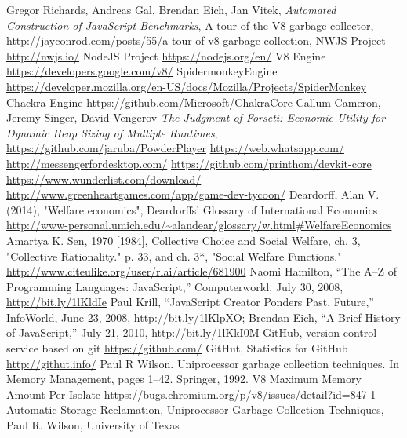 \documentclass{l4proj}
\begin{document}
\begin{thebibliography}{9}
Gregor Richards, Andreas Gal, Brendan Eich, Jan Vitek,
\emph{Automated Construction of JavaScript Benchmarks},
A tour of the V8 garbage collector,
\url{http://jayconrod.com/posts/55/a-tour-of-v8-garbage-collection},
NWJS Project
\url{http://nwjs.io/}
NodeJS Project
\url{https://nodejs.org/en/}
V8 Engine
\url{https://developers.google.com/v8/}
SpidermonkeyEngine
\url{https://developer.mozilla.org/en-US/docs/Mozilla/Projects/SpiderMonkey}
Chackra Engine
\url{https://github.com/Microsoft/ChakraCore}
Callum Cameron, Jeremy Singer, David Vengerov
\emph{The Judgment of Forseti: Economic Utility for Dynamic Heap Sizing of Multiple Runtimes},
\url{https://github.com/jaruba/PowderPlayer}
\url{https://web.whatsapp.com/}
\url{http://messengerfordesktop.com/}
\url{https://github.com/printhom/devkit-core}
\url{https://www.wunderlist.com/download/}
\url{http://www.greenheartgames.com/app/game-dev-tycoon/}
Deardorff, Alan V. (2014), "Welfare economics", Deardorffs' Glossary of International Economics \url{http://www-personal.umich.edu/~alandear/glossary/w.html#WelfareEconomics}
Amartya K. Sen, 1970 [1984], Collective Choice and Social Welfare, ch. 3, "Collective Rationality." p. 33, and ch. 3*, "Social Welfare Functions." \url{http://www.citeulike.org/user/rlai/article/681900}
Naomi Hamilton, “The A–Z of Programming Languages: JavaScript,” Computerworld, July 30, 2008, \url{http://bit.ly/1lKldIe}
 Paul Krill, “JavaScript Creator Ponders Past, Future,” InfoWorld, June 23, 2008, http://bit.ly/1lKlpXO; Brendan Eich, “A Brief History of JavaScript,” July 21, 2010, \url{http://bit.ly/1lKkI0M}
GitHub, version control service based on git \hspace*{1em} \url{https://github.com/}
GitHut, Statistics for GitHub \hspace*{1em} \url{http://githut.info/}
Paul R Wilson. Uniprocessor garbage collection techniques. In Memory Management, pages 1–42.
Springer, 1992.
V8 Maximum Memory Amount Per Isolate
\url{https://bugs.chromium.org/p/v8/issues/detail?id=847}
1 Automatic Storage Reclamation, Uniprocessor Garbage Collection Techniques, Paul R. Wilson, University of Texas

\end{thebibliography}
\end{document}
